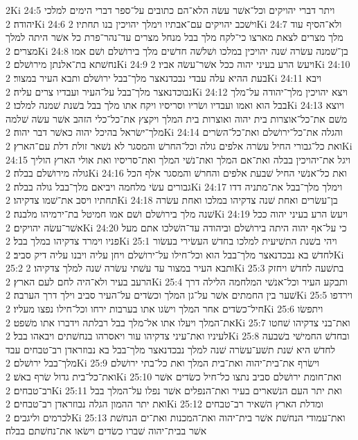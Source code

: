 2Ki 24:5  ויתר דברי יהויקים וכל־אשׁר עשׂה הלא־הם כתובים על־ספר דברי הימים למלכי יהודה׃
2Ki 24:6  וישׁכב יהויקים עם־אבתיו וימלך יהויכין בנו תחתיו׃
2Ki 24:7  ולא־הסיף עוד מלך מצרים לצאת מארצו כי־לקח מלך בבל מנחל מצרים עד־נהר־פרת כל אשׁר היתה למלך מצרים׃
2Ki 24:8  בן־שׁמנה עשׂרה שׁנה יהויכין במלכו ושׁלשׁה חדשׁים מלך בירושׁלם ושׁם אמו נחשׁתא בת־אלנתן מירושׁלם׃
2Ki 24:9  ויעשׂ הרע בעיני יהוה ככל אשׁר־עשׂה אביו׃
2Ki 24:10  בעת ההיא עלה עבדי נבכדנאצר מלך־בבל ירושׁלם ותבא העיר במצור׃
2Ki 24:11  ויבא נבוכדנאצר מלך־בבל על־העיר ועבדיו צרים עליה׃
2Ki 24:12  ויצא יהויכין מלך־יהודה על־מלך בבל הוא ואמו ועבדיו ושׂריו וסריסיו ויקח אתו מלך בבל בשׁנת שׁמנה למלכו׃
2Ki 24:13  ויוצא משׁם את־כל־אוצרות בית יהוה ואוצרות בית המלך ויקצץ את־כל־כלי הזהב אשׁר עשׂה שׁלמה מלך־ישׂראל בהיכל יהוה כאשׁר דבר יהוה׃
2Ki 24:14  והגלה את־כל־ירושׁלם ואת־כל־השׂרים ואת כל־גבורי החיל עשׂרה אלפים גולה וכל־החרשׁ והמסגר לא נשׁאר זולת דלת עם־הארץ׃
2Ki 24:15  ויגל את־יהויכין בבלה ואת־אם המלך ואת־נשׁי המלך ואת־סריסיו ואת אולי הארץ הוליך גולה מירושׁלם בבלה׃
2Ki 24:16  ואת כל־אנשׁי החיל שׁבעת אלפים והחרשׁ והמסגר אלף הכל גבורים עשׂי מלחמה ויביאם מלך־בבל גולה בבלה׃
2Ki 24:17  וימלך מלך־בבל את־מתניה דדו תחתיו ויסב את־שׁמו צדקיהו׃
2Ki 24:18  בן־עשׂרים ואחת שׁנה צדקיהו במלכו ואחת עשׂרה שׁנה מלך בירושׁלם ושׁם אמו חמיטל בת־ירמיהו מלבנה׃
2Ki 24:19  ויעשׂ הרע בעיני יהוה ככל אשׁר־עשׂה יהויקים׃
2Ki 24:20  כי על־אף יהוה היתה בירושׁלם וביהודה עד־השׁלכו אתם מעל פניו וימרד צדקיהו במלך בבל׃
2Ki 25:1  ויהי בשׁנת התשׁיעית למלכו בחדשׁ העשׂירי בעשׂור לחדשׁ בא נבכדנאצר מלך־בבל הוא וכל־חילו על־ירושׁלם ויחן עליה ויבנו עליה דיק סביב׃
2Ki 25:2  ותבא העיר במצור עד עשׁתי עשׂרה שׁנה למלך צדקיהו׃
2Ki 25:3  בתשׁעה לחדשׁ ויחזק הרעב בעיר ולא־היה לחם לעם הארץ׃
2Ki 25:4  ותבקע העיר וכל־אנשׁי המלחמה הלילה דרך שׁער בין החמתים אשׁר על־גן המלך וכשׂדים על־העיר סביב וילך דרך הערבה׃
2Ki 25:5  וירדפו חיל־כשׂדים אחר המלך וישׂגו אתו בערבות ירחו וכל־חילו נפצו מעליו׃
2Ki 25:6  ויתפשׂו את־המלך ויעלו אתו אל־מלך בבל רבלתה וידברו אתו משׁפט׃
2Ki 25:7  ואת־בני צדקיהו שׁחטו לעיניו ואת־עיני צדקיהו עור ויאסרהו בנחשׁתים ויבאהו בבל׃
2Ki 25:8  ובחדשׁ החמישׁי בשׁבעה לחדשׁ היא שׁנת תשׁע־עשׂרה שׁנה למלך נבכדנאצר מלך־בבל בא נבוזראדן רב־טבחים עבד מלך־בבל ירושׁלם׃
2Ki 25:9  וישׂרף את־בית־יהוה ואת־בית המלך ואת כל־בתי ירושׁלם ואת־כל־בית גדול שׂרף באשׁ׃
2Ki 25:10  ואת־חומת ירושׁלם סביב נתצו כל־חיל כשׂדים אשׁר רב־טבחים׃
2Ki 25:11  ואת יתר העם הנשׁארים בעיר ואת־הנפלים אשׁר נפלו על־המלך בבל ואת יתר ההמון הגלה נבוזראדן רב־טבחים׃
2Ki 25:12  ומדלת הארץ השׁאיר רב־טבחים לכרמים וליגבים׃
2Ki 25:13  ואת־עמודי הנחשׁת אשׁר בית־יהוה ואת־המכנות ואת־ים הנחשׁת אשׁר בבית־יהוה שׁברו כשׂדים וישׂאו את־נחשׁתם בבלה׃
